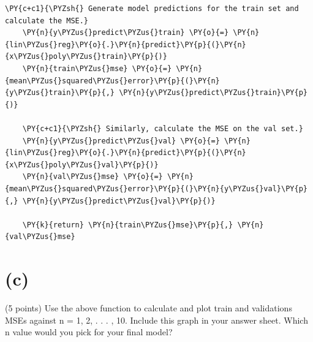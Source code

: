 \documentclass[a4paper,11pt]{article}%
\begin{document}
\begin{tcolorbox}[breakable, size=fbox, boxrule=1pt, pad at break*=1mm,colback=cellbackground, colframe=cellborder]
\begin{Verbatim}[commandchars=\\\{\}]
    \PY{c+c1}{\PYZsh{} Generate model predictions for the train set and calculate the MSE.}
    \PY{n}{y\PYZus{}predict\PYZus{}train} \PY{o}{=} \PY{n}{lin\PYZus{}reg}\PY{o}{.}\PY{n}{predict}\PY{p}{(}\PY{n}{x\PYZus{}poly\PYZus{}train}\PY{p}{)}
    \PY{n}{train\PYZus{}mse} \PY{o}{=} \PY{n}{mean\PYZus{}squared\PYZus{}error}\PY{p}{(}\PY{n}{y\PYZus{}train}\PY{p}{,} \PY{n}{y\PYZus{}predict\PYZus{}train}\PY{p}{)}

    \PY{c+c1}{\PYZsh{} Similarly, calculate the MSE on the val set.}
    \PY{n}{y\PYZus{}predict\PYZus{}val} \PY{o}{=} \PY{n}{lin\PYZus{}reg}\PY{o}{.}\PY{n}{predict}\PY{p}{(}\PY{n}{x\PYZus{}poly\PYZus{}val}\PY{p}{)}
    \PY{n}{val\PYZus{}mse} \PY{o}{=} \PY{n}{mean\PYZus{}squared\PYZus{}error}\PY{p}{(}\PY{n}{y\PYZus{}val}\PY{p}{,} \PY{n}{y\PYZus{}predict\PYZus{}val}\PY{p}{)}
    
    \PY{k}{return} \PY{n}{train\PYZus{}mse}\PY{p}{,} \PY{n}{val\PYZus{}mse}
\end{Verbatim}
\end{tcolorbox}

\pagebreak
    \hypertarget{c}{%
\section{(c)}\label{c}}

(5 points) Use the above function to calculate and plot train and
validations MSEs against n = 1, 2, . . . , 10. Include this graph in
your answer sheet. Which n value would you pick for your final model?
\end{document}
